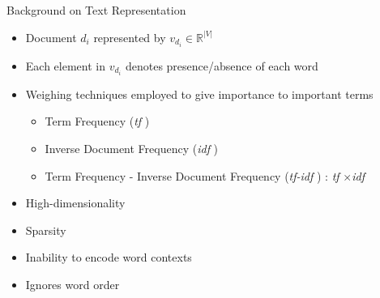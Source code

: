 \documentclass[10pt]{beamer}
\newcommand{\todo}[1]{\textcolor{red}{\textbf{TODO:} #1}}
\begin{document}
\begin{frame}{Background on Text Representation}
\vfill
{}
\begin{itemize}
	\vfill\item<2-> Document $d_{i}$ represented by $v_{d_{i}} \in \mathbb{R}^{|V|}$
	\vfill\item<3-> Each element in $v_{d_{i}}$ denotes presence/absence of each word
	\vfill\item<4-> Weighing techniques employed to give importance to important terms
	\begin{itemize}
		\vfill\item<5-> Term Frequency (\emph{tf} )
		\vfill\item<5-> Inverse Document Frequency (\emph{idf} )
		\vfill\item<5-> Term Frequency - Inverse Document Frequency (\emph{tf-idf} ) : \emph{tf} $\times$\emph{idf}
	\end{itemize}
\end{itemize}
\vfill
{}
\begin{itemize}
	\vfill\item<7-> High-dimensionality
	\vfill\item<8-> Sparsity
	\vfill\item<9-> Inability to encode word contexts
	\vfill\item<10-> Ignores word order
\end{itemize}
\vfill
\end{frame}

\end{document}
